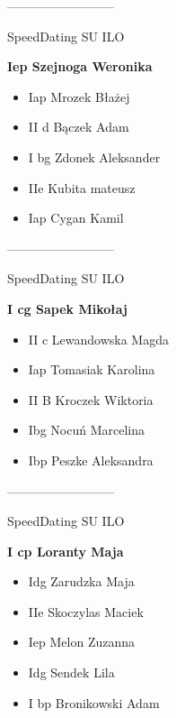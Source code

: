 \documentclass[a4paper,10pt]{article}
\begin{document}
\begin{multicols}{3}
\begin{minipage}[l]{\textwidth}
\end{minipage}



\begin{minipage}[l]{\textwidth}
--------------------------

  \footnotesize{SpeedDating SU ILO}

  \bfseries{Iep Szejnoga Weronika}

  \begin{itemize}
    \item Iap Mrozek Błażej
    \item II d Bączek Adam
    \item I bg Zdonek Aleksander
    \item IIe Kubita mateusz
    \item Iap Cygan Kamil

    \end{itemize}



\end{minipage}



\begin{minipage}[l]{\textwidth}
--------------------------

  \footnotesize{SpeedDating SU ILO}

  \bfseries{I cg Sapek Mikołaj}

  \begin{itemize}
    \item II c Lewandowska Magda
    \item Iap Tomasiak Karolina
    \item II B Kroczek Wiktoria
    \item Ibg Nocuń Marcelina
    \item Ibp Peszke Aleksandra

    \end{itemize}



\end{minipage}



\begin{minipage}[l]{\textwidth}
--------------------------

  \footnotesize{SpeedDating SU ILO}

  \bfseries{I cp Loranty Maja}

  \begin{itemize}
    \item Idg Zarudzka Maja
    \item IIe Skoczylas Maciek
    \item Iep Melon Zuzanna
    \item Idg Sendek Lila
    \item I bp Bronikowski Adam


\end{itemize}
\end{minipage}
\end{multicols}
\end{document}
